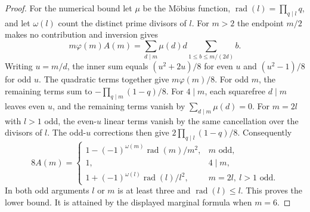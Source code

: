 \documentclass[a4paper,11pt]{article}
\theoremstyle{definition}
\theoremstyle{remark}
\numberwithin{equation}{section}
\begin{document}
\begin{proof}
For the numerical bound let \(\mu\) be the M\"obius function,
\(\operatorname{rad}(l)=\prod_{q\mid l}q\), and let \(\omega(l)\)
count the distinct prime divisors of \(l\). For \(m>2\) the
endpoint \(m/2\) makes no contribution and inversion gives
\[
 m\varphi(m) A(m)
       =\sum_{d\mid m}\mu(d)d\sum_{1\le b\le m/(2d)} b .
\]
Writing \(u=m/d\), the inner sum equals \((u^2+2u)/8\)
for even \(u\) and \((u^2-1)/8\) for odd \(u\).
The quadratic terms together give \(m\varphi(m)/8\).
For odd \(m\), the remaining terms sum to
\(-\prod_{q\mid m}(1-q)/8\). For \(4\mid m\), each squarefree
\(d\mid m\) leaves even \(u\), and the remaining terms vanish
by \(\sum_{d\mid m}\mu(d)=0\). For \(m=2l\) with \(l>1\)
odd, the even-\(u\) linear terms vanish by the same cancellation
over the divisors of \(l\). The odd-\(u\) corrections then give
\(2\prod_{q\mid l}(1-q)/8\). Consequently
\[
 8A(m)=
 \begin{cases}
 1-(-1)^{\omega(m)}\operatorname{rad}(m)/m^2,&m\text{ odd},\\
 1,&4\mid m,\\
 1+(-1)^{\omega(l)}\operatorname{rad}(l)/l^2,
                                         &m=2l,\ l>1\text{ odd}.
 \end{cases}
\]
In both odd arguments \(l\) or \(m\) is at least three and
\(\operatorname{rad}(l)\le l\). This proves the lower bound.
It is attained by the displayed marginal formula when \(m=6\).
\end{proof}
\end{document}
